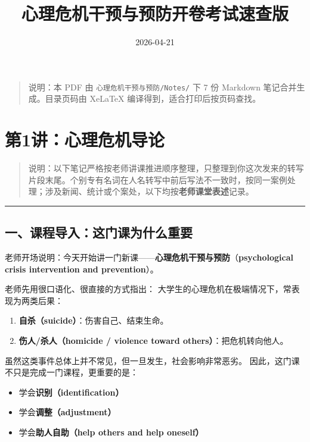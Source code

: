 \documentclass[
  chinese,
  9pt,
  a4paper,
]{ctexart}
\title{心理危机干预与预防开卷考试速查版}
\author{}
\date{2026-04-21}
\providecommand{\tightlist}{%
  \setlength{\itemsep}{0pt}\setlength{\parskip}{0pt}}
\begin{document}
\maketitle

{
\hypersetup{linkcolor=}
\setcounter{tocdepth}{4}
\tableofcontents
}
\begin{quote}
说明：本 PDF 由 \texttt{心理危机干预与预防/Notes/} 下 7 份 Markdown
笔记合并生成。目录页码由 XeLaTeX 编译得到，适合打印后按页码查找。
\end{quote}

\section{第1讲：心理危机导论}\label{ux7b2c1ux8bb2ux5fc3ux7406ux5371ux673aux5bfcux8bba}

\begin{quote}
说明：以下笔记严格按老师讲课推进顺序整理，只整理到你这次发来的转写片段末尾。个别专有名词在人名转写中前后写法不一致时，按同一案例处理；涉及新闻、统计或个案处，以下均按\textbf{老师课堂表述}记录。
\end{quote}

\begin{center}\rule{0.5\linewidth}{0.5pt}\end{center}

\subsection{一、课程导入：这门课为什么重要}\label{ux4e00ux8bfeux7a0bux5bfcux5165ux8fd9ux95e8ux8bfeux4e3aux4ec0ux4e48ux91cdux8981}

老师开场说明：今天开始讲一门新课------\textbf{心理危机干预与预防}（\textbf{psychological
crisis intervention and prevention}）。

老师先用很口语化、很直接的方式指出：
大学生的心理危机在极端情况下，常表现为两类后果：

\begin{enumerate}
\def\labelenumi{\arabic{enumi}.}
\tightlist
\item
  \textbf{自杀（suicide）}：伤害自己、结束生命。
\item
  \textbf{伤人/杀人（homicide / violence toward
  others）}：把危机转向他人。
\end{enumerate}

虽然这类事件总体上并不常见，但一旦发生，社会影响非常恶劣。
因此，这门课不只是完成一门课程，更重要的是：

\begin{itemize}
\tightlist
\item
  学会\textbf{识别（identification）}
\item
  学会\textbf{调整（adjustment）}
\item
  学会\textbf{助人自助（help others and help oneself）}
\end{itemize}
\end{document}
